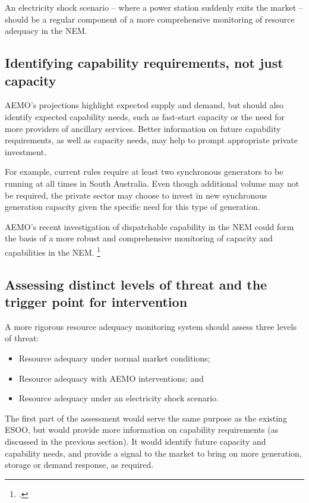 \documentclass[FrontPage]{grattan}
\begin{document}
An electricity shock scenario -- where a power station suddenly exits the market -- should be a regular component of a more comprehensive monitoring of resource adequacy in the NEM\@. 

\subsection{Identifying capability requirements, not just capacity}\label{subsec:identifying-capability-requirements-not-just-capacity} 
AEMO's projections highlight expected supply and demand, but should also identify expected capability needs, such as fast-start capacity or the need for more providers of ancillary services. Better information on future capability requirements, as well as capacity needs, may help to prompt appropriate private investment. 

For example, current rules require at least two synchronous generators to be running at all times in South Australia. Even though additional volume may not be required, the private sector may choose to invest in new synchronous generation capacity given the specific need for this type of generation.

AEMO's recent investigation of dispatchable capability in the NEM could form the basis of a more robust and comprehensive monitoring of capacity and capabilities in the NEM\@.%
\footcite{AEMO2017AdviceDispatchableCapacity}

\subsection{Assessing distinct levels of threat and the trigger point for intervention}\label{subsec:threat-levels-and-trigger-points} 
A more rigorous resource adequacy monitoring system should assess three levels of threat:
\begin{itemize}
    \item Resource adequacy under normal market conditions;
    \item Resource adequacy with AEMO interventions; and
    \item Resource adequacy under an electricity shock scenario.
\end{itemize}

The first part of the assessment would serve the same purpose as the existing ESOO, but would provide more information on capability requirements (as discussed in the previous section). It would identify future capacity and capability needs, and provide a signal to the market to bring on more generation, storage or demand response, as required. 
\end{document}
